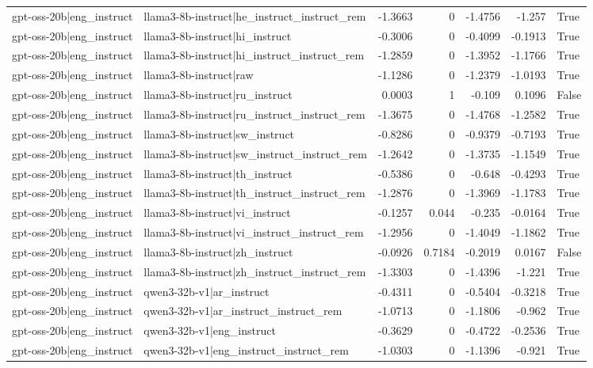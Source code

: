 \begin{table}
\begin{tabular}{l l r r r r l}
gpt-oss-20b|eng_instruct & llama3-8b-instruct|he_instruct_instruct_rem & -1.3663 & 0 & -1.4756 & -1.257 & True \\
gpt-oss-20b|eng_instruct & llama3-8b-instruct|hi_instruct & -0.3006 & 0 & -0.4099 & -0.1913 & True \\
gpt-oss-20b|eng_instruct & llama3-8b-instruct|hi_instruct_instruct_rem & -1.2859 & 0 & -1.3952 & -1.1766 & True \\
gpt-oss-20b|eng_instruct & llama3-8b-instruct|raw & -1.1286 & 0 & -1.2379 & -1.0193 & True \\
gpt-oss-20b|eng_instruct & llama3-8b-instruct|ru_instruct & 0.0003 & 1 & -0.109 & 0.1096 & False \\
gpt-oss-20b|eng_instruct & llama3-8b-instruct|ru_instruct_instruct_rem & -1.3675 & 0 & -1.4768 & -1.2582 & True \\
gpt-oss-20b|eng_instruct & llama3-8b-instruct|sw_instruct & -0.8286 & 0 & -0.9379 & -0.7193 & True \\
gpt-oss-20b|eng_instruct & llama3-8b-instruct|sw_instruct_instruct_rem & -1.2642 & 0 & -1.3735 & -1.1549 & True \\
gpt-oss-20b|eng_instruct & llama3-8b-instruct|th_instruct & -0.5386 & 0 & -0.648 & -0.4293 & True \\
gpt-oss-20b|eng_instruct & llama3-8b-instruct|th_instruct_instruct_rem & -1.2876 & 0 & -1.3969 & -1.1783 & True \\
gpt-oss-20b|eng_instruct & llama3-8b-instruct|vi_instruct & -0.1257 & 0.044 & -0.235 & -0.0164 & True \\
gpt-oss-20b|eng_instruct & llama3-8b-instruct|vi_instruct_instruct_rem & -1.2956 & 0 & -1.4049 & -1.1862 & True \\
gpt-oss-20b|eng_instruct & llama3-8b-instruct|zh_instruct & -0.0926 & 0.7184 & -0.2019 & 0.0167 & False \\
gpt-oss-20b|eng_instruct & llama3-8b-instruct|zh_instruct_instruct_rem & -1.3303 & 0 & -1.4396 & -1.221 & True \\
gpt-oss-20b|eng_instruct & qwen3-32b-v1|ar_instruct & -0.4311 & 0 & -0.5404 & -0.3218 & True \\
gpt-oss-20b|eng_instruct & qwen3-32b-v1|ar_instruct_instruct_rem & -1.0713 & 0 & -1.1806 & -0.962 & True \\
gpt-oss-20b|eng_instruct & qwen3-32b-v1|eng_instruct & -0.3629 & 0 & -0.4722 & -0.2536 & True \\
gpt-oss-20b|eng_instruct & qwen3-32b-v1|eng_instruct_instruct_rem & -1.0303 & 0 & -1.1396 & -0.921 & True \\

\end{tabular}
\end{table}
